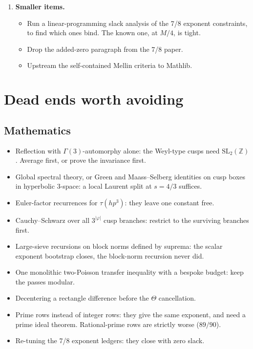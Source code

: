 \documentclass[11pt,a4paper]{article}
\begin{document}
\begin{enumerate}
\begin{itemize}
uncentered range $A\le5M/6$.
\end{itemize}
\item \textbf{Smaller items.}
\begin{itemize}
\item Run a linear-programming slack analysis of the 7/8 exponent constraints, to find which ones
bind. The known one, at $M/4$, is tight.
\item Drop the added-zero paragraph from the 7/8 paper.
\item Upstream the self-contained Mellin criteria to Mathlib.
\end{itemize}
\end{enumerate}

\section{Dead ends worth avoiding}\label{sec:deadends}
\subsection*{Mathematics}
\begin{itemize}
\item Reflection with $\Gamma(3)$-automorphy alone: the Weyl-type cusps need $\mathrm{SL}_2(\mathbb
Z)$. Average first, or prove the invariance first.
\item Global spectral theory, or Green and Maass--Selberg identities on cusp boxes in hyperbolic
3-space: a local Laurent split at $s=4/3$ suffices.
\item Euler-factor recurrences for $\tau(hp^3)$: they leave one constant free.
\item Cauchy--Schwarz over all $3^{|\varphi|}$ cusp branches: restrict to the surviving branches
first.
\item Large-sieve recursions on block norms defined by suprema: the scalar exponent bootstrap
closes, the block-norm recursion never did.
\item One monolithic two-Poisson transfer inequality with a bespoke budget: keep the passes modular.
\item Decentering a rectangle difference before the $\Theta$ cancellation.
\item Prime rows instead of integer rows: they give the same exponent, and need a prime ideal
theorem. Rational-prime rows are strictly worse ($89/90$).
\item Re-tuning the 7/8 exponent ledgers: they close with zero slack.
\end{itemize}
\end{document}
